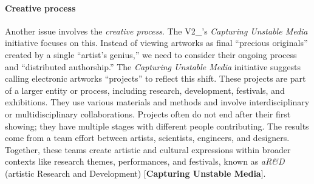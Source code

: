 \paragraph*{Creative process}
Another issue involves the \textit{creative process}. The V2\_’s \textit{Capturing Unstable Media} initiative focuses on this. Instead of viewing artworks as final ``precious originals'' created by a single ``artist's genius,'' we need to consider their ongoing process and ``distributed authorship.'' The \textit{Capturing Unstable Media} initiative suggests calling electronic artworks ``projects'' to reflect this shift. These projects are part of a larger entity or process, including research, development, festivals, and exhibitions. They use various materials and methods and involve interdisciplinary or multidisciplinary collaborations. Projects often do not end after their first showing; they have multiple stages with different people contributing. The results come from a team effort between artists, scientists, engineers, and designers. Together, these teams create artistic and cultural expressions within broader contexts like research themes, performances, and festivals, known as \textit{aR\&D} (artistic Research and Development) [\textbf{Capturing Unstable Media}].

